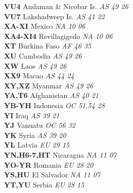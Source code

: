 ﻿\documentclass[landscape,a4paper]{article}
\begin{document}
\begin{multicols}{6}
\textbf{VU4                     } Andaman \& Nicobar Is.             \emph{ AS     49     26    } \\
\textbf{VU7                     } Lakshadweep Is.                    \emph{ AS     41     22    } \\
\textbf{XA-XI                   } Mexico                             \emph{ NA     10     06    } \\
\textbf{XA4-XI4                 } Revillagigedo                      \emph{ NA     10     06    } \\
\textbf{XT                      } Burkina Faso                       \emph{ AF     46     35    } \\
\textbf{XU                      } Cambodia                           \emph{ AS     49     26    } \\
\textbf{XW                      } Laos                               \emph{ AS     49     26    } \\
\textbf{XX9                     } Macao                              \emph{ AS     44     24    } \\
\textbf{XY,XZ                   } Myanmar                            \emph{ AS     49     26    } \\
\textbf{YA,T6                   } Afghanistan                        \emph{ AS     40     21    } \\
\textbf{YB-YH                   } Indonesia                          \emph{ OC     51,54  28    } \\
\textbf{YI                      } Iraq                               \emph{ AS     39     21    } \\
\textbf{YJ                      } Vanuatu                            \emph{ OC     56     32    } \\
\textbf{YK                      } Syria                              \emph{ AS     39     20    } \\
\textbf{YL                      } Latvia                             \emph{ EU     29     15    } \\
\textbf{YN,H6-7,HT              } Nicaragua                          \emph{ NA     11     07    } \\
\textbf{YO-YR                   } Romania                            \emph{ EU     28     20    } \\
\textbf{YS,HU                   } El Salvador                        \emph{ NA     11     07    } \\
\textbf{YT,YU                   } Serbia                             \emph{ EU     28     15    } \\

\end{multicols}
\end{document}
